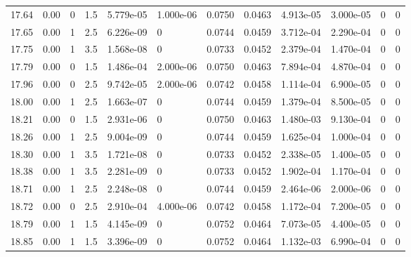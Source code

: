 \documentclass[preview]{standalone}
\begin{document}
{{{{{{\begin{tabular}{L{1.2cm}C{1.2cm} C{0.3cm}C{0.5cm} C{1.4cm}C{1.4cm} C{1.4cm}C{1.4cm} C{1.6cm}C{1.6cm} C{1.6cm}C{1.6cm}}
  17.64  &  0.00  & 0     & 1.5 &  5.779e-05  & 1.000e-06  &  0.0750&   0.0463& 4.913e-05 & 3.000e-05   &  0 & 0  \\ 
  17.65  &  0.00  & 1     & 2.5 &  6.226e-09  & 0  &  0.0744&   0.0459& 3.712e-04 & 2.290e-04   &  0 & 0  \\ 
  17.75  &  0.00  & 1     & 3.5 &  1.568e-08  & 0  &  0.0733&   0.0452& 2.379e-04 & 1.470e-04   &  0 & 0  \\ 
  17.79  &  0.00  & 0     & 1.5 &  1.486e-04  & 2.000e-06  &  0.0750&   0.0463& 7.894e-04 & 4.870e-04   &  0 & 0  \\ 
  17.96  &  0.00  & 0     & 2.5 &  9.742e-05  & 2.000e-06  &  0.0742&   0.0458& 1.114e-04 & 6.900e-05   &  0 & 0  \\ 
  18.00  &  0.00  & 1     & 2.5 &  1.663e-07  & 0  &  0.0744&   0.0459& 1.379e-04 & 8.500e-05   &  0 & 0  \\ 
  18.21  &  0.00  & 0     & 1.5 &  2.931e-06  & 0  &  0.0750&   0.0463& 1.480e-03 & 9.130e-04   &  0 & 0  \\ 
  18.26  &  0.00  & 1     & 2.5 &  9.004e-09  & 0  &  0.0744&   0.0459& 1.625e-04 & 1.000e-04   &  0 & 0  \\ 
  18.30  &  0.00  & 1     & 3.5 &  1.721e-08  & 0  &  0.0733&   0.0452& 2.338e-05 & 1.400e-05   &  0 & 0  \\ 
  18.38  &  0.00  & 1     & 3.5 &  2.281e-09  & 0  &  0.0733&   0.0452& 1.902e-04 & 1.170e-04   &  0 & 0  \\ 
  18.71  &  0.00  & 1     & 2.5 &  2.248e-08  & 0  &  0.0744&   0.0459& 2.464e-06 & 2.000e-06   &  0 & 0  \\ 
  18.72  &  0.00  & 0     & 2.5 &  2.910e-04  & 4.000e-06  &  0.0742&   0.0458& 1.172e-04 & 7.200e-05   &  0 & 0  \\ 
  18.79  &  0.00  & 1     & 1.5 &  4.145e-09  & 0  &  0.0752&   0.0464& 7.073e-05 & 4.400e-05   &  0 & 0  \\ 
  18.85  &  0.00  & 1     & 1.5 &  3.396e-09  & 0  &  0.0752&   0.0464& 1.132e-03 & 6.990e-04   &  0 & 0  \\ 
\hline 
\end{tabular} 

}}}}}}
\end{document}
